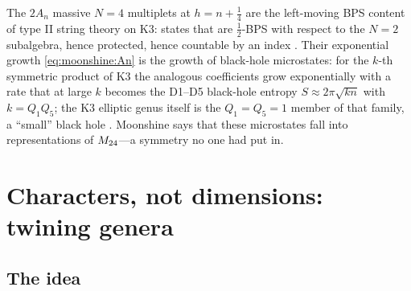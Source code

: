 \begin{physicsbox}
The $2A_n$ massive $N=4$ multiplets at $h=n+\tfrac14$ are the left-moving BPS content of
type II string theory on K3: states that are $\tfrac12$-BPS with respect to the $N=2$
subalgebra, hence protected, hence countable by an index .
Their exponential growth \eqref{eq:moonshine:An} is the growth of black-hole microstates:
for the $k$-th symmetric product of K3 the analogous coefficients grow exponentially with
a rate that at large $k$ becomes the D1--D5 black-hole entropy $S\approx2\pi\sqrt{kn}$
with $k=Q_1Q_5$; the K3 elliptic genus
itself is the $Q_1=Q_5=1$ member of that family, a ``small'' black hole
. Moonshine
says that these microstates fall into representations of $M_{24}$---a symmetry no one had
put in.
\end{physicsbox}

\section{Characters, not dimensions: twining genera}\label{sec:moonshine:twining}

\subsection{The idea}

